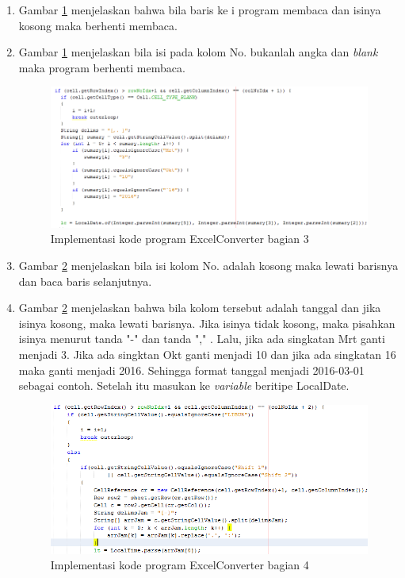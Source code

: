 \begin{enumerate}
\begin{enumerate}
\begin{figure}[H]
		\caption{Implementasi kode program ExcelConverter  bagian 2}
		\label{fig:ExcelConverter3}
		\end{figure}
		\item Gambar \ref{fig:ExcelConverter3} menjelaskan bahwa bila baris ke i program membaca dan isinya kosong maka berhenti membaca.
		\item Gambar \ref{fig:ExcelConverter3} menjelaskan bila isi pada kolom No. bukanlah angka dan \textit{blank} maka program berhenti membaca.
		\begin{figure}[H]
		\centering
		\includegraphics[scale=0.7]{Gambar/excelConverter4}
		\caption{Implementasi kode program ExcelConverter  bagian 3}
		\label{fig:ExcelConverter4}
		\end{figure}
		
		\item Gambar \ref{fig:ExcelConverter4} menjelaskan	bila isi kolom No. adalah kosong maka lewati barisnya dan baca baris selanjutnya.
		\item Gambar \ref{fig:ExcelConverter4} menjelaskan bahwa bila kolom tersebut adalah tanggal dan jika isinya kosong, maka lewati barisnya. Jika isinya tidak kosong, maka pisahkan isinya menurut tanda "-" dan tanda "," . Lalu, jika ada singkatan Mrt ganti menjadi 3. Jika ada singktan Okt ganti menjadi 10 dan jika ada singkatan 16 maka ganti menjadi 2016. Sehingga format tanggal menjadi 2016-03-01 sebagai contoh. Setelah itu masukan ke \textit{variable} beritipe LocalDate.
		\begin{figure}[H]
		\centering
		\includegraphics[scale=0.7]{Gambar/excelConverter5}
		\caption{Implementasi kode program ExcelConverter  bagian 4}
		\label{fig:ExcelConverter5}
		\end{figure}
		

\end{enumerate}
\end{enumerate}
